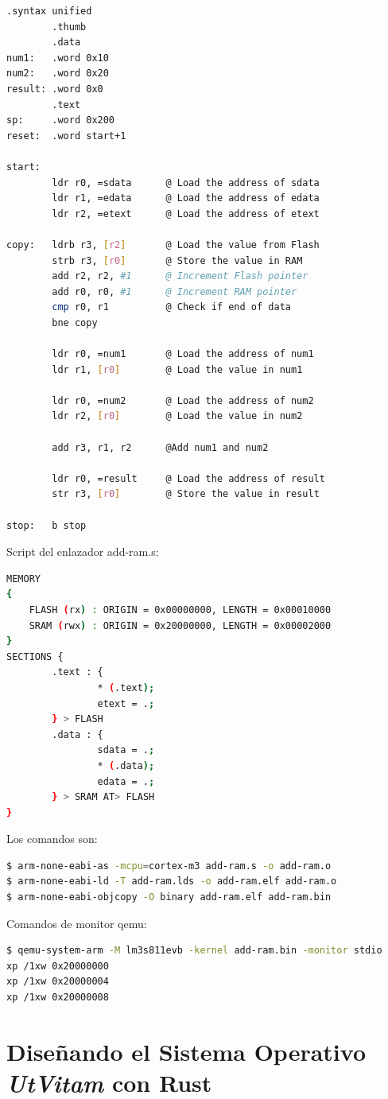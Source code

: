 \documentclass[12pt, twoside]{report}
\begin{document}
\begin{lstlisting}[language=bash]
		.syntax unified
		.thumb
		.data
num1:	.word 0x10
num2:	.word 0x20
result: .word 0x0
		.text
sp:		.word 0x200
reset:	.word start+1

start:
		ldr r0, =sdata		@ Load the address of sdata
		ldr r1, =edata		@ Load the address of edata
		ldr r2, =etext		@ Load the address of etext

copy: 	ldrb r3, [r2]		@ Load the value from Flash
		strb r3, [r0]		@ Store the value in RAM
		add r2, r2, #1		@ Increment Flash pointer 
		add r0, r0, #1      @ Increment RAM pointer
		cmp r0, r1			@ Check if end of data
		bne	copy
		
		ldr r0, =num1		@ Load the address of num1
		ldr r1, [r0]		@ Load the value in num1
		
		ldr r0, =num2		@ Load the address of num2
		ldr r2, [r0]		@ Load the value in num2
		
		add r3, r1, r2 		@Add num1 and num2
		
		ldr r0, =result		@ Load the address of result
		str r3, [r0]		@ Store the value in result
		
stop:	b stop
\end{lstlisting}

Script del enlazador add-ram.s:

\begin{lstlisting}[language=bash]
MEMORY
{
	FLASH (rx) : ORIGIN = 0x00000000, LENGTH = 0x00010000
	SRAM (rwx) : ORIGIN = 0x20000000, LENGTH = 0x00002000
}
SECTIONS {
		.text : {
				* (.text);
				etext = .;
		} > FLASH
		.data : {
				sdata = .;
				* (.data);
				edata = .;
		} > SRAM AT> FLASH
}
\end{lstlisting}

Los comandos son:

\begin{lstlisting}[language=bash]
$ arm-none-eabi-as -mcpu=cortex-m3 add-ram.s -o add-ram.o
$ arm-none-eabi-ld -T add-ram.lds -o add-ram.elf add-ram.o
$ arm-none-eabi-objcopy -O binary add-ram.elf add-ram.bin
\end{lstlisting}

Comandos de monitor qemu:
\begin{lstlisting}[language=bash]
$ qemu-system-arm -M lm3s811evb -kernel add-ram.bin -monitor stdio
xp /1xw 0x20000000
xp /1xw 0x20000004
xp /1xw 0x20000008
\end{lstlisting}



\chapter{Diseñando el Sistema Operativo \textbf{\textit{UtVitam}} con Rust}
\end{document}
